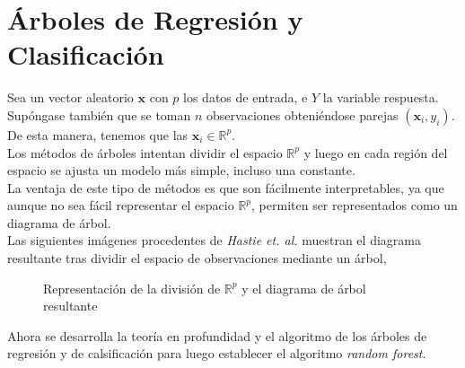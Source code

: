 \newpage
\section{Árboles de Regresión y Clasificación}
\noindent Sea un vector aleatorio $\textbf{x}$ con $p$ los datos de entrada, e $Y$ la variable respuesta. Supóngase también que se toman $n$ observaciones obteniéndose parejas $(\textbf{x}_i,y_i)$. De esta manera, tenemos que las $\textbf{x}_i\in \mathbb{R}^p$.\\
Los métodos de árboles intentan dividir el espacio $\mathbb{R}^p$ y luego en cada región del espacio se ajusta un modelo más simple, incluso una constante.\\
La ventaja de este tipo de métodos es que son fácilmente interpretables, ya que aunque no sea fácil representar el espacio $\mathbb{R}^p$, permiten ser representados como un diagrama de árbol.\\ 
Las  siguientes imágenes procedentes de \textit{Hastie et. al.}\cite{Hastie 2001} muestran el diagrama resultante tras dividir el espacio de observaciones mediante un árbol, 

\begin{figure}[h]
 \centering
 \caption{Representación de la división de $\mathbb{R}^p$ y el diagrama de árbol resultante}
 \label{f:MARC1}
\end{figure}

\noindent Ahora se desarrolla la teoría en profundidad y el algoritmo de los árboles de regresión y de calsificación para luego establecer el algoritmo \textit{random forest}.
